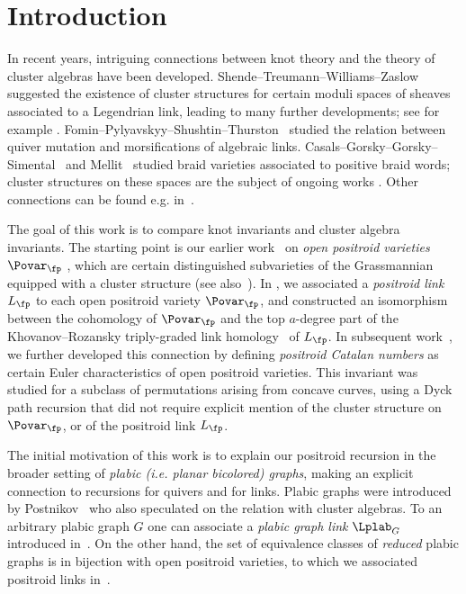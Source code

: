 \section{Introduction}
%
%
In recent years, intriguing connections between knot theory and the theory of cluster algebras have been developed.  Shende--Treumann--Williams--Zaslow~\cite{STWZ} suggested the existence of cluster structures for certain moduli spaces of sheaves associated to a Legendrian link, leading to many further developments; see for example \cite{SW,CG,CW}.  Fomin--Pylyavskyy--Shushtin--Thurston~\cite{FPST} studied the relation between quiver mutation and morsifications of algebraic links.  Casals--Gorsky--Gorsky--Simental~\cite{CGGS} and Mellit~\cite{Mellit_Cell} studied braid varieties associated to positive braid words; cluster structures on these spaces are the subject of ongoing works \cite{CGGLSS,GLSBS1,GLSBS2}. Other connections can be found e.g. in~\cite{HiIn,Muller_skein,LeeSch,BMS}.
%

The goal of this work is to compare knot invariants and cluster algebra invariants.  The starting point is our earlier work~\cite{GL_qtcat} on \emph{open positroid varieties} $\Povar_\fp$ \cite{KLS}, which are certain distinguished subvarieties of the Grassmannian equipped with a cluster structure \cite{GL_cluster} (see also~\cite{Scott,MSLA,Lec,SSBW}).  In \cite{GL_qtcat}, we associated a \emph{positroid link} $L_\fp$ to each open positroid variety $\Povar_\fp$, and constructed an isomorphism between the cohomology of $\Povar_\fp$ and the top $a$-degree part of the Khovanov--Rozansky triply-graded link homology~\cite{KR1,KR2,KhoSoe} of $L_\fp$.   In subsequent work~\cite{GL_cat_combin}, we further developed this connection by defining \emph{positroid Catalan numbers} as certain Euler characteristics of open positroid varieties.  This invariant was studied for a subclass of permutations arising from concave curves, using a Dyck path recursion that did not require explicit mention of the cluster structure on $\Povar_\fp$, or of the positroid link $L_\fp$.

The initial motivation of this work is to explain our positroid recursion in the broader setting of \emph{plabic (i.e. planar bicolored) graphs}, making an explicit connection to recursions for quivers and for links.  Plabic graphs were introduced by Postnikov~\cite{Pos} who also speculated on the relation with cluster algebras. 
%
%
 To an arbitrary plabic graph $G$ one can associate a \emph{plabic graph link} $\Lplab_G$ introduced in~\cite{FPST,STWZ}.
 On the other hand, the set of equivalence classes of \emph{reduced} plabic graphs is in bijection with open positroid varieties, to which we associated positroid links in~\cite{GL_qtcat}.


